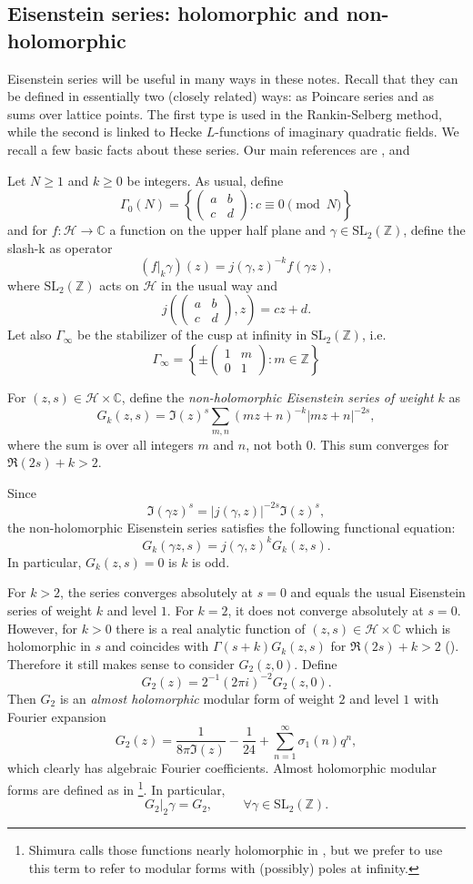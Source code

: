 \documentclass[twoside,10pt]{article}
\newcommand{\Z}{\mathbb{Z}}
\newcommand{\C}{\mathbb{C}}
\newcommand{\rarr}{\rightarrow}
\newcommand{\esp}{\hspace{1cm}}
\renewcommand{\H}{\mathcal{H}}
\newcommand{\SL}{\textrm{SL}_2(\mathbb{Z})}
\begin{document}
\subsection{Eisenstein series: holomorphic and non-holomorphic}\label{sec:Eisen}
Eisenstein series will be useful in many ways in these notes. Recall that they can be defined in essentially two (closely related) ways: as Poincare series and as sums over lattice points. The first type is used in the Rankin-Selberg method, while the second is linked to Hecke $L$-functions of imaginary quadratic fields. We recall a few basic facts about these series. Our main references are \cite[Ch.9]{Shi1}, \cite[A3]{Shi1} and \cite[Ch.7]{Miya}

Let $N\geq 1$ and $k\geq 0$ be integers. As usual, define
\[\Gamma_0(N)=\left \{\begin{pmatrix}
a & b \\ 
c & d
\end{pmatrix} :c\equiv 0\pmod N\right \}\]
and for $f:\H\rarr\C$ a function on the upper half plane and $\gamma\in\SL$, define the slash-k as operator
\[(f\vert_k\gamma)(z)=j(\gamma,z)^{-k}f(\gamma z),\]
where $\SL$ acts on $\H$ in the usual way and
\[j\left (\begin{pmatrix}
a & b \\ 
c & d
\end{pmatrix},z\right )=cz+d.\]
Let also $\Gamma_\infty$ be the stabilizer of the cusp at infinity in $\SL$, i.e.
\[\Gamma_\infty=\left \{\pm\begin{pmatrix}
1 & m \\ 
0 & 1
\end{pmatrix} :m\in\Z\right \}\]

For $(z,s)\in\H\times\C$, define the \emph{non-holomorphic Eisenstein series of weight $k$} as
\[G_k(z,s)=\Im(z)^s\sum_{m,n}(mz+n)^{-k}|mz+n|^{-2s},\]
where the sum is over all integers $m$ and $n$, not both $0$. This sum converges for $\Re(2s)+k>2$.

Since
\[\Im(\gamma z)^s=|j(\gamma,z)|^{-2s}\Im(z)^s,\]
the non-holomorphic Eisenstein series satisfies the following functional equation:
\[G_k(\gamma z,s)=j(\gamma,z)^kG_k(z,s).\]
In particular, $G_k(z,s) = 0$ is $k$ is odd.

For $k>2$, the series converges absolutely at $s=0$ and equals the usual Eisenstein series of weight $k$ and level $1$. For $k=2$, it does not converge absolutely at $s=0$. However, for $k>0$ there is a real analytic function of $(z,s)\in\H\times\C$ which is holomorphic in $s$ and coincides with $\Gamma(s+k)G_k(z,s)$ for $\Re(2s)+k>2$ (\cite[Thm A3.5]{Shi1}). Therefore it still makes sense to consider $G_2(z,0)$. Define
\[G_2(z)=2^{-1}(2\pi i)^{-2}G_2(z,0).\]
Then $G_2$ is  an \emph{almost holomorphic} modular form of weight $2$ and level $1$ with Fourier expansion
\[G_2(z)=\frac{1}{8\pi\Im(z)}-\frac{1}{24}+\sum_{n=1}^\infty\sigma_1(n)q^n,\]
which clearly has algebraic Fourier coefficients. Almost holomorphic modular forms are defined as in \cite[Sec. 5.3]{Zag}\footnote{Shimura calls those functions nearly holomorphic in \cite{Shi1}, but we prefer to use this term to refer to modular forms with (possibly) poles at infinity.}. In particular,
\[G_2\vert_2\gamma=G_2,\esp\forall\gamma\in\SL.\]
\end{document}
